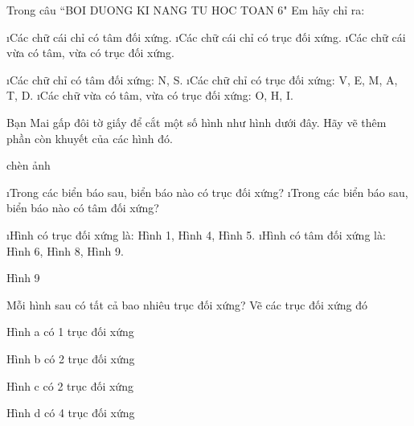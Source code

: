 \begin{bt}
	Trong câu ``BOI DUONG KI NANG TU HOC TOAN 6"
	Em hãy chỉ ra:
	\begin{enumerate}[a), leftmargin=*]
		\i Các chữ cái chỉ có tâm đối xứng.
		\i Các chữ cái chỉ có trục đối xứng.
		\i Các chữ cái vừa có tâm, vừa có trục đối xứng.
	\end{enumerate}
	\begin{loigiaichuong36}
		\begin{enumerate}[a), leftmargin=*]
			\i Các chữ chỉ có tâm đối xứng: N, S.
			\i Các chữ chỉ có trục đối xứng: V, E, M, A, T, D.
			\i Các chữ vừa có tâm, vừa có trục đối xứng: O, H, I.
		\end{enumerate}
	\end{loigiaichuong36}
\end{bt}
\begin{bt}
	Bạn Mai gấp đôi tờ giấy để cắt một số hình như hình dưới đây. Hãy vẽ thêm phần còn khuyết của các hình đó.
	\begin{loigiaichuong36}
		chèn ảnh
	\end{loigiaichuong36}
\end{bt}
\begin{bt}
	\begin{enumerate}[a), leftmargin=*]
		\i Trong các biển báo sau, biển báo nào có trục đối xứng?
%		
%		
%		
%		
		\i Trong các biển báo sau, biển báo nào có tâm đối xứng?
%		
%		
	\end{enumerate}
	\begin{loigiaichuong36}
		\begin{enumerate}[a), leftmargin=*]
			\i Hình có trục đối xứng là: Hình 1, Hình  4, Hình  5.
			\i Hình có tâm đối xứng là: Hình 6, Hình 8, Hình  9.
		\end{enumerate}
	\end{loigiaichuong36}
\end{bt}                                                                 Hình 9
\begin{bt}
	Mỗi hình sau có tất cả bao nhiêu trục đối xứng? Vẽ các trục đối xứng đó
%	
%	
%	
	\begin{loigiaichuong36}
		Hình a có 1 trục đối xứng
		
		Hình b có 2 trục đối xứng
		
		Hình c có 2 trục đối xứng
		
		Hình d có 4 trục đối xứng
	\end{loigiaichuong36}
\end{bt}
